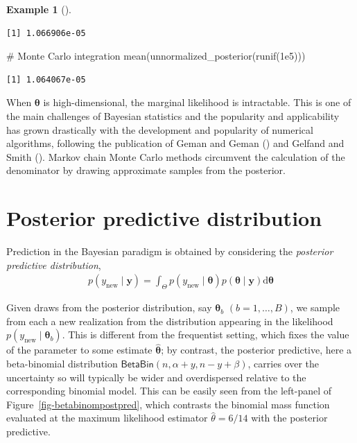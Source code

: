 \documentclass[
  11pt,
  letterpaper,
]{scrbook}
\newenvironment{Shaded}{\begin{snugshade}}{\end{snugshade}}
\newcommand{\CommentTok}[1]{\textcolor[rgb]{0.37,0.37,0.37}{#1}}
\newcommand{\FloatTok}[1]{\textcolor[rgb]{0.68,0.00,0.00}{#1}}
\newcommand{\FunctionTok}[1]{\textcolor[rgb]{0.28,0.35,0.67}{#1}}
\newcommand{\NormalTok}[1]{\textcolor[rgb]{0.00,0.23,0.31}{#1}}
\theoremstyle{definition}
\theoremstyle{plain}
\theoremstyle{plain}
\theoremstyle{definition}
\newtheorem{example}{Example}[chapter]
\theoremstyle{definition}
\theoremstyle{remark}
\begin{document}
\begin{example}[]
\begin{verbatim}
[1] 1.066906e-05
\end{verbatim}

\begin{Shaded}
\begin{Highlighting}[]
\CommentTok{\# Monte Carlo integration}
\FunctionTok{mean}\NormalTok{(}\FunctionTok{unnormalized\_posterior}\NormalTok{(}\FunctionTok{runif}\NormalTok{(}\FloatTok{1e5}\NormalTok{)))}
\end{Highlighting}
\end{Shaded}

\begin{verbatim}
[1] 1.064067e-05
\end{verbatim}

\end{example}

When \(\boldsymbol{\theta}\) is high-dimensional, the marginal
likelihood is intractable. This is one of the main challenges of
Bayesian statistics and the popularity and applicability has grown
drastically with the development and popularity of numerical algorithms,
following the publication of Geman and Geman
() and Gelfand and Smith
(). Markov chain Monte Carlo
methods circumvent the calculation of the denominator by drawing
approximate samples from the posterior.

\section{Posterior predictive
distribution}\label{posterior-predictive-distribution}

Prediction in the Bayesian paradigm is obtained by considering the
\emph{posterior predictive distribution}, \begin{align*}
p(y_{\text{new}} \mid \boldsymbol{y}) =
\int_{\Theta} p(y_{\text{new}}  \mid \boldsymbol{\theta}) p(\boldsymbol{\theta} \mid  \boldsymbol{y}) \mathrm{d} \boldsymbol{\theta}
\end{align*}

Given draws from the posterior distribution, say
\(\boldsymbol{\theta}_b\) \((b=1, \ldots, B)\), we sample from each a
new realization from the distribution appearing in the likelihood
\(p(y_{\text{new}}  \mid \boldsymbol{\theta}_b)\). This is different
from the frequentist setting, which fixes the value of the parameter to
some estimate \(\widehat{\boldsymbol{\theta}}\); by contrast, the
posterior predictive, here a beta-binomial distribution
\(\mathsf{BetaBin}(n, \alpha + y, n - y + \beta)\), carries over the
uncertainty so will typically be wider and overdispersed relative to the
corresponding binomial model. This can be easily seen from the
left-panel of Figure~\ref{fig-betabinompostpred}, which contrasts the
binomial mass function evaluated at the maximum likelihood estimator
\(\widehat{\theta}=6/14\) with the posterior predictive.
\end{document}
